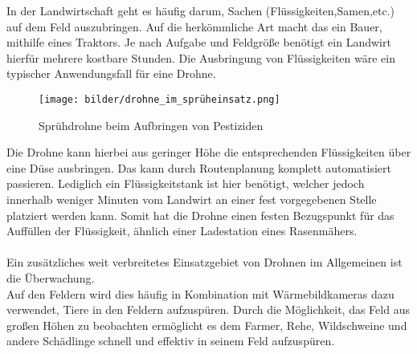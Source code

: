 In der Landwirtschaft geht es häufig darum, Sachen (Flüssigkeiten,Samen,etc.) auf dem Feld auszubringen. Auf die herkömmliche Art macht das ein Bauer, mithilfe eines Traktors.
Je nach Aufgabe und Feldgröße benötigt ein Landwirt hierfür mehrere kostbare Stunden. Die Ausbringung von Flüssigkeiten wäre ein typischer Anwendungsfall für eine Drohne.

\begin{figure}[ht]
	\centering
	\texttt{[image: bilder/drohne\_im\_sprüheinsatz.png]}
	\caption[Sprühdrohne]{Sprühdrohne beim Aufbringen von Pestiziden}
	\label{fig:sprühdrohne}
\end{figure}

Die Drohne kann hierbei aus geringer Höhe die entsprechenden Flüssigkeiten über eine Düse ausbringen.
Das kann durch Routenplanung komplett automatisiert passieren. 
Lediglich ein Flüssigkeitstank ist hier benötigt, welcher jedoch innerhalb weniger Minuten vom Landwirt an einer fest vorgegebenen Stelle platziert werden kann.
Somit hat die Drohne einen festen Bezugspunkt für das Auffüllen der Flüssigkeit, ähnlich einer Ladestation eines Rasenmähers.
\\
\\Ein zusätzliches weit verbreitetes Einsatzgebiet von Drohnen im Allgemeinen ist die Überwachung.
\\Auf den Feldern wird dies häufig in Kombination mit Wärmebildkameras dazu verwendet, Tiere in den Feldern aufzuspüren.
Durch die Möglichkeit, das Feld aus großen Höhen zu beobachten ermöglicht es dem Farmer, Rehe, Wildschweine und andere Schädlinge schnell und effektiv in seinem Feld aufzuspüren.
